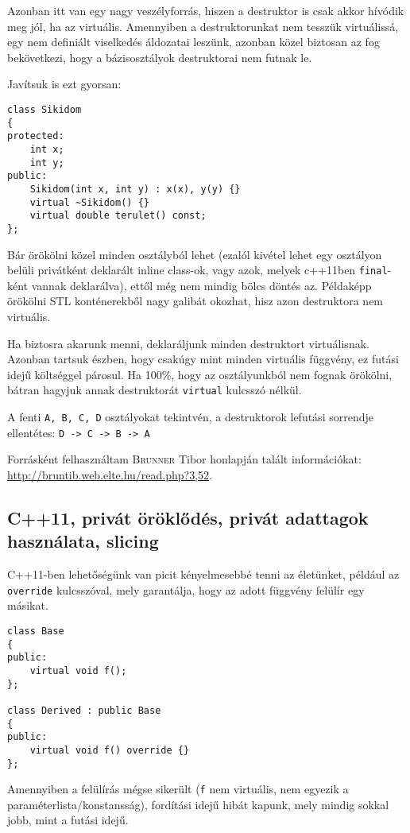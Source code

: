 \documentclass[a4paper,11.5pt,table]{article}
\begin{document}
	Azonban itt van egy nagy veszélyforrás, hiszen a destruktor is csak akkor hívódik meg jól, ha az virtuális. Amennyiben a destruktorunkat nem tesszük virtuálissá, egy nem definiált viselkedés áldozatai leszünk, azonban közel biztosan az fog bekövetkezi, hogy a bázisosztályok destruktorai nem futnak le.
	
	\smallskip
	Javítsuk is ezt gyorsan:
\begin{lstlisting}
class Sikidom
{
protected:
	int x;
	int y;
public:
	Sikidom(int x, int y) : x(x), y(y) {}
	virtual ~Sikidom() {}
	virtual double terulet() const;
};
\end{lstlisting}
	Bár örökölni közel minden osztályból lehet (ezalól kivétel lehet egy osztályon belüli privátként deklarált inline class-ok, vagy azok, melyek c++11ben \texttt{final}-ként vannak deklarálva), ettől még nem mindig bölcs döntés az. Példaképp örökölni STL konténerekből nagy galibát okozhat, hisz azon destruktora nem virtuális.
	
	\medskip
	Ha biztosra akarunk menni, deklaráljunk minden destruktort virtuálisnak. Azonban tartsuk észben, hogy csakúgy mint minden virtuális függvény, ez futási idejű költséggel párosul. Ha 100\%, hogy az osztályunkból nem fognak örökölni, bátran hagyjuk annak destruktorát \texttt{virtual} kulcsszó nélkül.
	
	\medskip
	A fenti \texttt{A, B, C, D} osztályokat tekintvén, a destruktorok lefutási sorrendje ellentétes:  \texttt{D -> C -> B -> A}
	
	\bigskip
	
	Forrásként felhasználtam \textsc{Brunner} Tibor honlapján talált információkat: \url{http://bruntib.web.elte.hu/read.php?3,52}.
	
	\subsection{C++11, privát öröklődés, privát adattagok használata, slicing}
	
	\medskip
	C++11-ben lehetőségünk van picit kényelmesebbé tenni az életünket, például az \texttt{override} kulcsszóval, mely garantálja, hogy az adott függvény felülír egy másikat.
	\begin{lstlisting}
class Base
{
public:
	virtual void f();
};

class Derived : public Base
{
public:
	virtual void f() override {}
};
	\end{lstlisting}
	Amennyiben a felülírás mégse sikerült (\texttt{f} nem virtuális, nem egyezik a paraméterlista/konstansság), fordítási idejű hibát kapunk, mely mindig sokkal jobb, mint a futási idejű.
	
\end{document}

